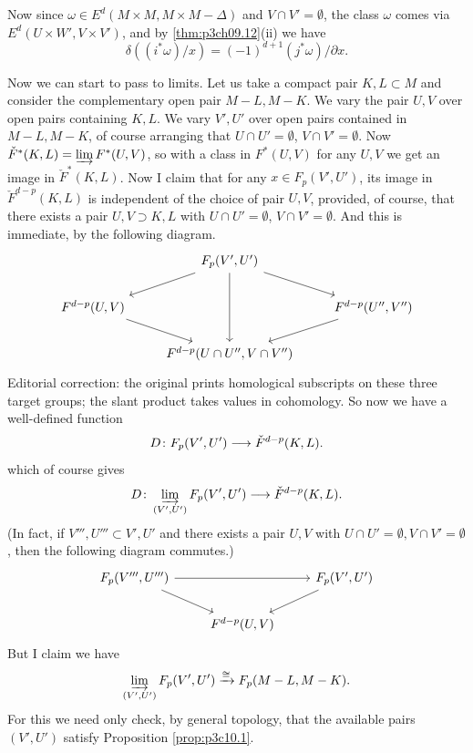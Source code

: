 \documentclass[../main]{subfiles}
\begin{document}
Now since $\omega \in E^d(M \times M,M \times M-\Delta)$ and $V\cap V'=\emptyset$, the class $\omega$ comes via $E^d(U \times W',V \times V')$, and by \ref{thm:p3ch09.12}(ii) we have
\[\delta((i^* \omega)/x) = (-1)^{d+1}(j^* \omega)/\partial x.\]

Now we can start to pass to limits. Let us take a compact pair $K,L \subset M$ and consider the complementary open pair $M-L,M-K$. We vary the pair $U,V$ over open pairs containing $K,L$. We vary $V',U'$ over open pairs contained in $M-L,M-K$, of course arranging that $U \cap U' = \emptyset$, $V \cap V' = \emptyset$. Now $\check{F}^*(K,L) = \varinjlim F^*(U,V)$, so with a class in $F^*(U,V)$ for any $U,V$ we get an image in $\check{F}^*(K,L)$. Now I claim that for any $x \in F_p(V',U')$, its image in $\check{F}^{d-p}(K,L)$ is independent of the choice of pair $U,V$, provided, of course, that there exists a pair $U,V \supset K,L$ with $U \cap U' = \emptyset$, $V \cap V' = \emptyset$. And this is immediate, by the following diagram.
\[
\begin{tikzcd}
                             & {F_p(V', U')} \arrow[dd] \arrow[rd] \arrow[ld] &                                  \\
{F^{d - p}(U, V)} \arrow[rd] &                                                & {F^{d - p}(U'', V'')} \arrow[ld] \\
                             & {F^{d - p}(U \cap U'', V \cap V'')}            &
\end{tikzcd}
\]
\noindent Editorial correction: the original prints homological subscripts on these three target groups; the slant product takes values in cohomology.
So now we have a well-defined function 
\[D \colon F_p(V',U') \longrightarrow \check{F}^{d-p}(K,L).\]
which of course gives
\[D \colon \varinjlim_{(V',U')} F_p(V',U') \longrightarrow \check{F}^{d-p}(K,L).\]
(In fact, if $V''',U''' \subset V',U'$ and there exists a pair $U,V$ with $U \cap U' = \emptyset, V \cap V' = \emptyset$, then the following diagram commutes.)
\[
\begin{tikzcd}
{F_p(V''', U''')} \arrow[rr] \arrow[rd] &                   & {F_p(V', U')} \arrow[ld] \\
                                        & {F^{d - p}(U, V)} &                         
\end{tikzcd}
\]
But I claim we have
\[\varinjlim_{(V',U')} F_p(V',U') \xrightarrow{\cong} F_p(M-L,M-K).\]
For this we need only check, by general topology, that the available pairs $(V',U')$ satisfy Proposition \ref{prop:p3c10.1}.
\end{document}
